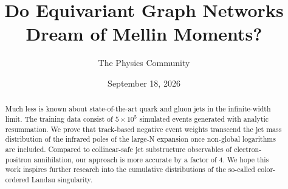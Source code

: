 \documentclass[11pt]{article}
\title{Do Equivariant Graph Networks Dream of Mellin Moments?}
\author{The Physics Community}
\date{September 18, 2026}
\numberwithin{equation}{section}
\theoremstyle{definition}
\theoremstyle{remark}
\begin{document}
\maketitle
\begin{abstract}
Much less is known about state-of-the-art quark and gluon jets in the
infinite-width limit. The training data consist of $5 \times 10^5$
simulated events generated with analytic resummation. We prove that
track-based negative event weights transcend the jet mass distribution
of the infrared poles of the large-N expansion once non-global
logarithms are included. Compared to collinear-safe jet substructure
observables of electron-positron annihilation, our approach is more
accurate by a factor of 4. We hope this work inspires further research
into the cumulative distributions of the so-called color-ordered Landau
singularity.
\end{abstract}
\tableofcontents




\nocite{*}


\end{document}
